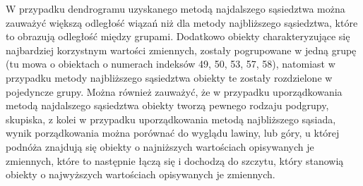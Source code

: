 \documentclass[12pt,a4paper]{report}
\begin{document}
{W przypadku dendrogramu uzyskanego metodą najdalszego sąsiedztwa można
zauważyć większą odległość wiązań niż dla metody najbliższego
sąsiedztwa, które to obrazują odległość między grupami. Dodatkowo
obiekty charakteryzujące się najbardziej korzystnym wartości zmiennych,
zostały pogrupowane w jedną grupę (tu mowa o obiektach o numerach
indeksów 49, 50, 53, 57, 58), natomiast w przypadku metody najbliższego
sąsiedztwa obiekty te zostały rozdzielone w pojedyncze grupy. Można
również zauważyć, że w przypadku uporządkowania metodą najdalszego
sąsiedztwa obiekty tworzą pewnego rodzaju podgrupy, skupiska, z kolei w
przypadku uporządkowania metodą najbliższego sąsiada, wynik
porządkowania można porównać do wyglądu lawiny, lub góry, u której
podnóża znajdują się obiekty o najniższych wartościach opisywanych je
zmiennych, które to następnie łączą się i dochodzą do szczytu, który stanowią
obiekty o najwyższych wartościach opisywanych je zmiennych.

}
\end{document}
